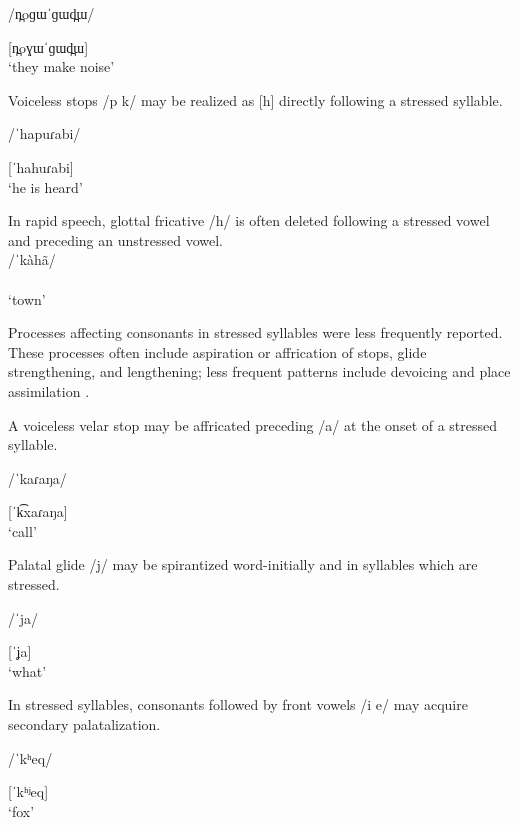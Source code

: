 /n̪oɡɯˈɡɯd̪ɯ/

[n̪oɣɯˈɡɯd̪ɯ]\\
\glt ‘they make noise’
\citep[27]{Donohue1999}
\z

\ea\label{ex:5.20}

Voiceless stops /p k/ may be realized as [h] directly following a stressed syllable.

/ˈhapuɾabi/

[ˈhahuɾabi]\\
\glt ‘he is heard’
\citep[123]{Chacon2012}
\z



\ea\label{ex:5.21}
In rapid speech, glottal fricative /h/ is often deleted following a stressed vowel and preceding an unstressed vowel.\\
/ˈkàhã/\\\relax
[ˈk\`{ã}ː]\\
\glt ‘town’
\citep[24]{Holt1999}
\z

  Processes affecting consonants in stressed syllables were less frequently reported. These processes often include aspiration or affrication of stops, glide strengthening, and lengthening; less frequent patterns include devoicing and place assimilation .

\ea\label{ex:5.22}

A voiceless velar stop may be affricated preceding /a/ at the onset of a stressed syllable.

/ˈkaɾaŋa/

[ˈk͡xaɾaŋa]\\
\glt ‘call’
\citep[521--522]{Bauer1999}
\z

\ea\label{ex:5.23}

Palatal glide /j/ may be spirantized word-initially and in syllables which are stressed.

/ˈja/

[ˈʝa]\\
\glt ‘what’
\citep[31--32]{Slater2003}
\z

\ea\label{ex:5.24}

In stressed syllables, consonants followed by front vowels /i e/ may acquire secondary palatalization.

/ˈkʰeq/

[ˈkʰʲeq]\\
\glt ‘fox’
\citep[23]{Shiraishi2006}
\z

